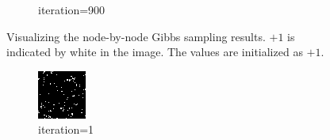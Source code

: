 \documentclass{article}
\begin{document}
\begin{figure}[h]
\begin{subfigure}[t]{0.18\textwidth}
\vspace{-0.6cm}
\caption{iteration=900}
\end{subfigure}\hspace{0.01\textwidth}
\caption{Visualizing the node-by-node Gibbs sampling results. $+1$ is indicated by white in the image. The values are initialized as $+1$.}
\label{f:63a}
\end{figure}
%
\begin{figure}[h]
\captionsetup[subfigure]{labelformat=empty}
\centering
\begin{subfigure}[t]{0.18\textwidth}
\centering
\includegraphics[width=\textwidth]{./computational/results/gibbs_node_sampler_negative_iter_0.png}
\vspace{-0.6cm}
\caption{iteration=1}
\end{subfigure}\hspace{0.01\textwidth}
\begin{subfigure}[t]{0.18\textwidth}
\centering

\end{subfigure}
\end{figure}
\end{document}
